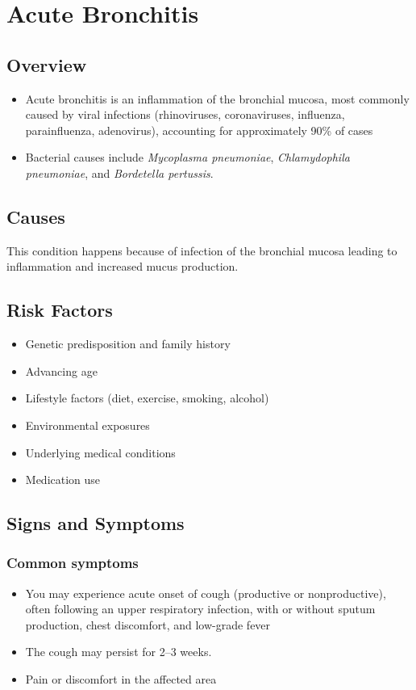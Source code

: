 \chapter{Acute Bronchitis}
\label{sec:Acute Bronchitis}

\section{Overview}


\begin{itemize}[noitemsep]
  \item Acute bronchitis is an inflammation of the bronchial mucosa, most commonly caused by viral infections (rhinoviruses, coronaviruses, influenza, parainfluenza, adenovirus), accounting for approximately 90\% of cases
  \item Bacterial causes include \textit{Mycoplasma pneumoniae}, \textit{Chlamydophila pneumoniae}, and \textit{Bordetella pertussis}.
\end{itemize}
\section{Causes}
This condition happens because of infection of the bronchial mucosa leading to inflammation and increased mucus production.     
\section{Risk Factors}

\begin{itemize}[noitemsep]
  \item Genetic predisposition and family history
  \item Advancing age
  \item Lifestyle factors (diet, exercise, smoking, alcohol)
  \item Environmental exposures
  \item Underlying medical conditions
  \item Medication use
\end{itemize}
\section{Signs and Symptoms}

\subsection{Common symptoms}
\begin{itemize}[noitemsep]
  \item You may experience acute onset of cough (productive or nonproductive), often following an upper respiratory infection, with or without sputum production, chest discomfort, and low-grade fever
  \item The cough may persist for 2--3 weeks.
  \item Pain or discomfort in the affected area
  \end{itemize}

